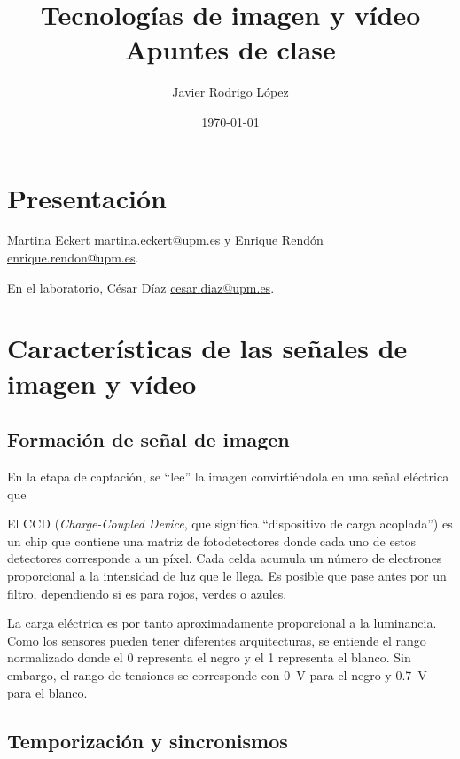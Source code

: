 \documentclass[10pt]{book}
\title{\Huge Tecnologías de imagen y vídeo\\\huge Apuntes de clase}
\author{Javier Rodrigo López}
\date{\today}
\begin{document}
\maketitle

\tableofcontents


\newpage

\chapter{Presentación}

Martina Eckert \href{mailto:martina.eckert@upm.es}{martina.eckert@upm.es}  y Enrique Rendón \href{mailto:enrique.rendon@upm.es}{enrique.rendon@upm.es}.

En el laboratorio, César Díaz \href{mailto:cesar.diaz@upm.es}{cesar.diaz@upm.es}.

\chapter{Características de las señales de imagen y vídeo}

\section{Formación de señal de imagen}

En la etapa de captación, se ``lee'' la imagen convirtiéndola en una señal eléctrica que

El CCD (\textit{Charge-Coupled Device}, que significa ``dispositivo de carga acoplada'') es un chip que contiene una matriz de fotodetectores donde cada uno de estos detectores corresponde a un píxel. Cada celda acumula un número de electrones proporcional a la intensidad de luz que le llega. Es posible que pase antes por un filtro, dependiendo si es para rojos, verdes o azules.

La carga eléctrica es por tanto aproximadamente proporcional a la luminancia. Como los sensores pueden tener diferentes arquitecturas, se entiende el rango normalizado donde el 0 representa el negro y el 1 representa el blanco. Sin embargo, el rango de tensiones se corresponde con \SI{0}{\volt} para el negro y \SI{0.7}{\volt} para el blanco.

\section{Temporización y sincronismos} \vspace*{5pt}
\end{document}
